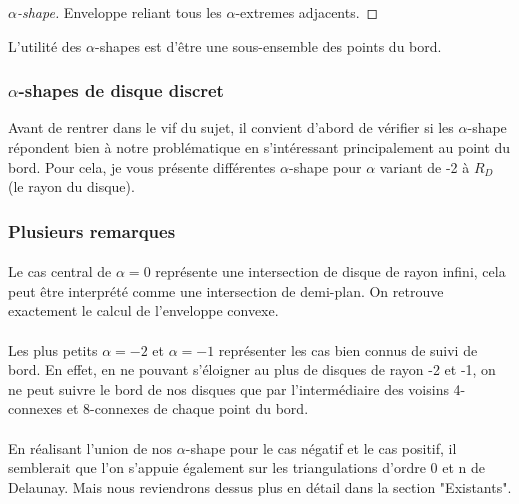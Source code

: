 \begin{proof}[$\alpha$-shape]
      Enveloppe reliant tous les $\alpha$-extremes adjacents.
\end{proof}


L'utilité des $\alpha$-shapes est d'être une sous-ensemble des points du bord. 

\subsubsection{$\alpha$-shapes de disque discret}

Avant de rentrer dans le vif du sujet, il convient d'abord de vérifier si les $\alpha$-shape répondent bien à notre problématique en s'intéressant principalement au point du bord. Pour cela, je vous présente différentes $\alpha$-shape pour $\alpha$ variant de -2 à $R_D$ (le rayon du disque).


\subsubsection{Plusieurs remarques}

\paragraph{}
Le cas central de $\alpha = 0$ représente une intersection de disque de rayon infini, cela peut être interprété comme une intersection de demi-plan. On retrouve exactement le calcul de l'enveloppe convexe.

\paragraph{}
Les plus petits $\alpha = -2$ et $\alpha = -1$ représenter les cas bien connus de suivi de bord. En effet, en ne pouvant s'éloigner au plus de disques de rayon -2 et -1, on ne peut suivre le bord de nos disques que par l'intermédiaire des voisins 4-connexes et 8-connexes de chaque point du bord.

\paragraph{}
En réalisant l'union de nos $\alpha$-shape pour le cas négatif et le cas positif, il semblerait que l'on s'appuie également sur les triangulations d'ordre 0 et n de Delaunay. Mais nous reviendrons dessus plus en détail dans la section "Existants".\\

